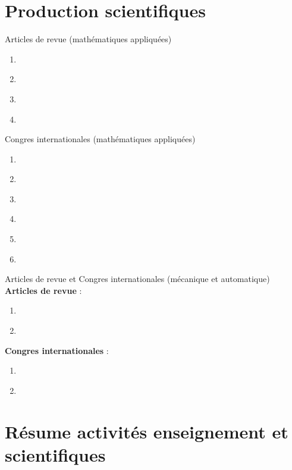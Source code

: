\documentclass[aspectratio=169, french]{beamer}
\begin{document}
\section{Production scientifiques}

\begin{frame}{Articles de revue (mathématiques appliquées)}
\begin{enumerate}
	\item \cite{brugnoli2022df}
	\item \cite{brugnoli2021num}
	\item \cite{brugnoli2019ammmin}
	\item \cite{brugnoli2019ammkir}
\end{enumerate}


\end{frame}


\begin{frame}{Congres internationales (mathématiques appliquées)}
\footnotesize	
\begin{enumerate}
	\item \cite{brugnoli2021vk}
	\item \cite{rashad2021ext}
	\item \cite{cherifi2021data}
	\item \cite{brugnoli2021siamcse}
	\item \cite{brugnoli2020mtns}
	\item \cite{brugnoli2019cpde}
\end{enumerate}

\end{frame}

\begin{frame}{Articles de revue et Congres internationales (mécanique et automatique)}
	\textbf{Articles de revue} : 
	\begin{enumerate}
		\item \cite{brugnoli2021ther}
		\item \cite{brugnoli2020msd}
	\end{enumerate}
	\textbf{Congres internationales} :
	\begin{enumerate}
		\item \cite{brugnoli2019cdc}
		\item \cite{cardoso2019cdc}
	\end{enumerate}
\end{frame}

\section{Résume activités enseignement et scientifiques}
\end{document}
